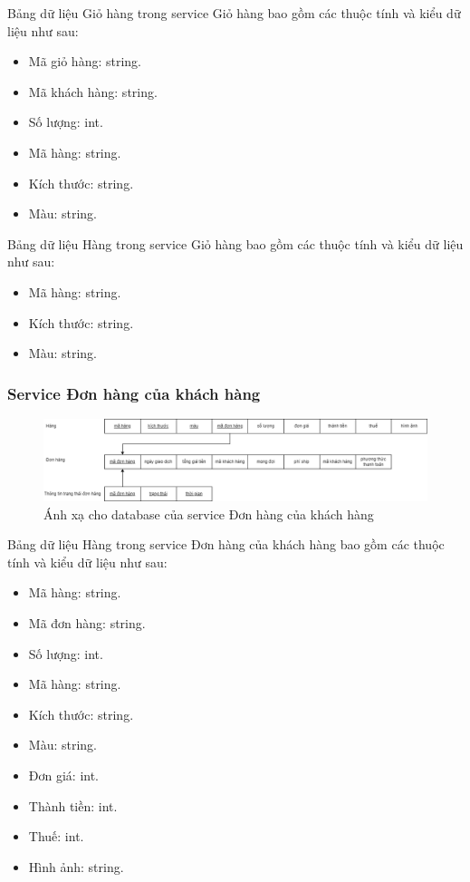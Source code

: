 Bảng dữ liệu Giỏ hàng trong service Giỏ hàng bao gồm các thuộc tính và kiểu dữ liệu như sau:
\begin{itemize}
	\item Mã giỏ hàng: string.
	\item Mã khách hàng: string.
	\item Số lượng: int.
	\item Mã hàng: string.
	\item Kích thước: string.
	\item Màu: string.
\end{itemize}

Bảng dữ liệu Hàng trong service Giỏ hàng bao gồm các thuộc tính và kiểu dữ liệu như sau:
\begin{itemize}
	\item Mã hàng: string.
	\item Kích thước: string.
	\item Màu: string.
\end{itemize}

\subsubsection{Service Đơn hàng của khách hàng}
\begin{figure}[!htp]
	\begin{center}
		\includegraphics[width=1\textwidth]{img/database/mapping/mapping-customer-order.png}
		\newline
		\caption{Ánh xạ cho database của service Đơn hàng của khách hàng}
	\end{center}
\end{figure}

Bảng dữ liệu Hàng trong service Đơn hàng của khách hàng bao gồm các thuộc tính và kiểu dữ liệu như sau:
\begin{itemize}
	\item Mã hàng: string.
	\item Mã đơn hàng: string.
	\item Số lượng: int.
	\item Mã hàng: string.
	\item Kích thước: string.
	\item Màu: string.
	\item Đơn giá: int.
	\item Thành tiền: int.
	\item Thuế: int.
	\item Hình ảnh: string.
\end{itemize}

